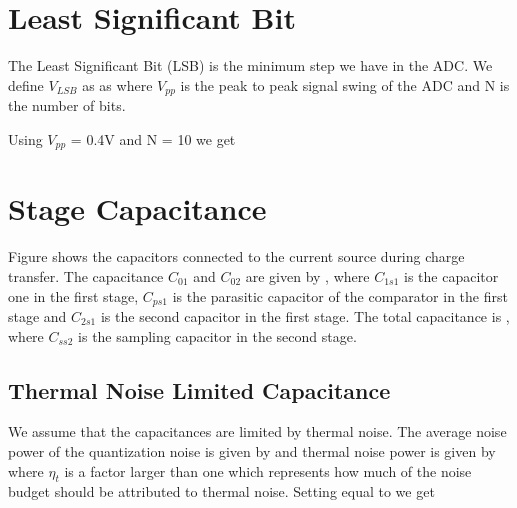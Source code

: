 



\section{Least Significant Bit}
The Least Significant Bit (LSB) is the minimum step we have in the
ADC. We define $V_{LSB}$ as as 
where $V_{pp}$ is the peak to peak signal swing of the ADC and N is the
number of bits.

\begin{exmp}
Using $V_{pp}$ = 0.4V and N = 10 we get

\end{exmp}

\section{Stage Capacitance}

Figure  shows the capacitors connected to the
current source during charge transfer. The capacitance $C_{01}$ and
$C_{02}$ are given by
, where $C_{1s1}$ is the capacitor one in the first stage, $C_{ps1}$
is the parasitic capacitor of the comparator in the first stage and
$C_{2s1}$ is the second capacitor in the first stage. The total
capacitance is
, where $C_{ss2}$ is the sampling capacitor in the second stage.

\subsection{Thermal Noise Limited Capacitance}
We assume that the capacitances are limited by thermal noise.
The 
average noise power of the quantization noise is given by
and thermal noise power is given by
where $\eta_t$ is a factor larger than one which represents how much
of the noise budget should be attributed to thermal noise.
Setting  equal to   we get

